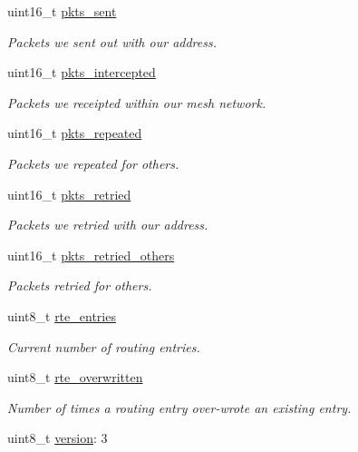 \begin{DoxyCompactItemize}
uint16\+\_\+t \hyperlink{struct____attribute_____a1cfd2d5a79aed9120f40669b04e6f649}{pkts\+\_\+sent}
\begin{DoxyCompactList}\small\item\em Packets we sent out with our address. \end{DoxyCompactList}\item 
uint16\+\_\+t \hyperlink{struct____attribute_____a8483976361231cd091d9f0138fef1e47}{pkts\+\_\+intercepted}
\begin{DoxyCompactList}\small\item\em Packets we receipted within our mesh network. \end{DoxyCompactList}\item 
uint16\+\_\+t \hyperlink{struct____attribute_____a209e5ba4478f5776ee65788d276d5f2c}{pkts\+\_\+repeated}
\begin{DoxyCompactList}\small\item\em Packets we repeated for others. \end{DoxyCompactList}\item 
uint16\+\_\+t \hyperlink{struct____attribute_____a01cdbd0aa173d415d86566adef6775a3}{pkts\+\_\+retried}
\begin{DoxyCompactList}\small\item\em Packets we retried with our address. \end{DoxyCompactList}\item 
uint16\+\_\+t \hyperlink{struct____attribute_____ae79aae50e9255af8fc03b6988c7d5e12}{pkts\+\_\+retried\+\_\+others}
\begin{DoxyCompactList}\small\item\em Packets retried for others. \end{DoxyCompactList}\item 
uint8\+\_\+t \hyperlink{struct____attribute_____adbc91f28865d1eae6895599dc900465b}{rte\+\_\+entries}
\begin{DoxyCompactList}\small\item\em Current number of routing entries. \end{DoxyCompactList}\item 
uint8\+\_\+t \hyperlink{struct____attribute_____a9ea2df6bafe8f3ef1c124a962b028bcb}{rte\+\_\+overwritten}
\begin{DoxyCompactList}\small\item\em Number of times a routing entry over-\/wrote an existing entry. \end{DoxyCompactList}\item 
uint8\+\_\+t \hyperlink{struct____attribute_____a2e226654212aebfb764a8df90d66b006}{version}\+: 3

\end{DoxyCompactItemize}
